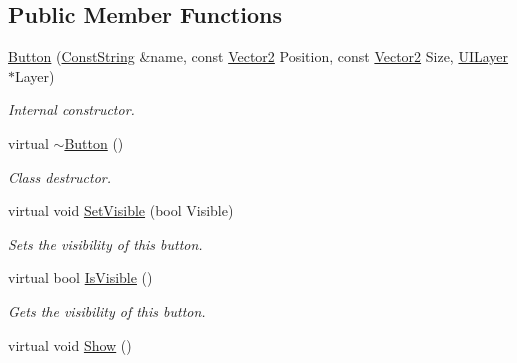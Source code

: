 \subsection*{Public Member Functions}
\begin{DoxyCompactItemize}
\item 
\hyperlink{classphys_1_1UI_1_1Button_a3a6c635f427093a5e4247611e3120948}{Button} (\hyperlink{namespacephys_a5ce5049f8b4bf88d6413c47b504ebb31}{ConstString} \&name, const \hyperlink{classphys_1_1Vector2}{Vector2} Position, const \hyperlink{classphys_1_1Vector2}{Vector2} Size, \hyperlink{classphys_1_1UILayer}{UILayer} $\ast$Layer)
\begin{DoxyCompactList}\small\item\em Internal constructor. \item\end{DoxyCompactList}\item 
\hypertarget{classphys_1_1UI_1_1Button_a80c8c92ae289e3161dde94bf1a5de59e}{
virtual \hyperlink{classphys_1_1UI_1_1Button_a80c8c92ae289e3161dde94bf1a5de59e}{$\sim$Button} ()}
\label{d8/d88/classphys_1_1UI_1_1Button_a80c8c92ae289e3161dde94bf1a5de59e}

\begin{DoxyCompactList}\small\item\em Class destructor. \item\end{DoxyCompactList}\item 
virtual void \hyperlink{classphys_1_1UI_1_1Button_a293a0a5296778fb3d638c31c5d9d4c75}{SetVisible} (bool Visible)
\begin{DoxyCompactList}\small\item\em Sets the visibility of this button. \item\end{DoxyCompactList}\item 
virtual bool \hyperlink{classphys_1_1UI_1_1Button_a2bca8ace690157fa2646bcf1cb54397a}{IsVisible} ()
\begin{DoxyCompactList}\small\item\em Gets the visibility of this button. \item\end{DoxyCompactList}\item 
\hypertarget{classphys_1_1UI_1_1Button_aad25b9ec4b9c7cc232d419dcd68f420e}{
virtual void \hyperlink{classphys_1_1UI_1_1Button_aad25b9ec4b9c7cc232d419dcd68f420e}{Show} ()}
\label{d8/d88/classphys_1_1UI_1_1Button_aad25b9ec4b9c7cc232d419dcd68f420e}


\end{DoxyCompactItemize}
